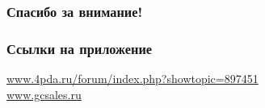 \documentclass{beamer}
\begin{document}
\begin{frame}[c]
\begin{center}
\frametitle{\LARGE Спасибо за внимание!}

{\LARGE \inserttitle}

\bigskip

{\insertauthor}

\bigskip\bigskip

{\insertinstitute}

\bigskip\bigskip

{\large \insertdate}
\end{center}
\end{frame}

\begin{frame}[c]
\begin{center}
\frametitle{\LARGE Ссылки на приложение}

    \url{www.4pda.ru/forum/index.php?showtopic=897451}
    \bigskip\\
    \bigskip\bigskip
    \url{www.gcsales.ru}

\end{center}
\end{frame}
\end{document}
